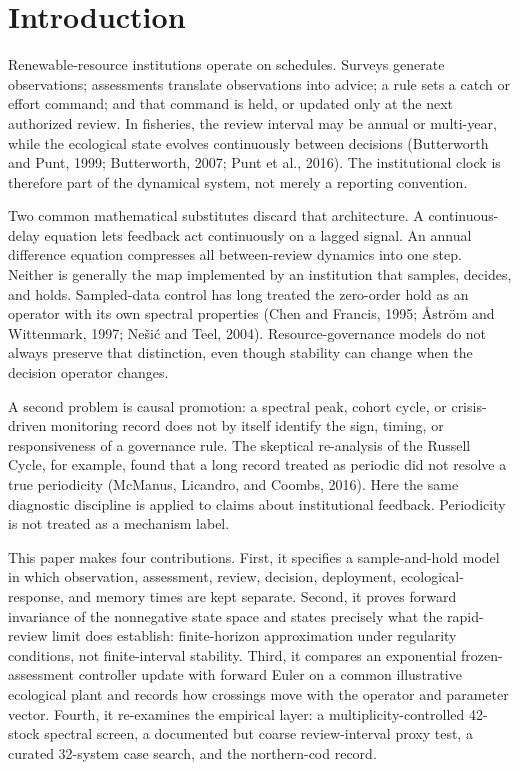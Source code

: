 \section{Introduction}\label{sec:introduction}

Renewable-resource institutions operate on schedules. Surveys generate observations; assessments translate observations into advice; a rule sets a catch or effort command; and that command is held, or updated only at the next authorized review. In fisheries, the review interval may be annual or multi-year, while the ecological state evolves continuously between decisions (Butterworth and Punt, 1999; Butterworth, 2007; Punt et al., 2016). The institutional clock is therefore part of the dynamical system, not merely a reporting convention.

Two common mathematical substitutes discard that architecture. A continuous-delay equation lets feedback act continuously on a lagged signal. An annual difference equation compresses all between-review dynamics into one step. Neither is generally the map implemented by an institution that samples, decides, and holds. Sampled-data control has long treated the zero-order hold as an operator with its own spectral properties (Chen and Francis, 1995; \AA{}str\"om and Wittenmark, 1997; Ne\v{s}i\'c and Teel, 2004). Resource-governance models do not always preserve that distinction, even though stability can change when the decision operator changes.

A second problem is causal promotion: a spectral peak, cohort cycle, or crisis-driven monitoring record does not by itself identify the sign, timing, or responsiveness of a governance rule. The skeptical re-analysis of the Russell Cycle, for example, found that a long record treated as periodic did not resolve a true periodicity (McManus, Licandro, and Coombs, 2016). Here the same diagnostic discipline is applied to claims about institutional feedback. Periodicity is not treated as a mechanism label.

This paper makes four contributions. First, it specifies a sample-and-hold model in which observation, assessment, review, decision, deployment, ecological-response, and memory times are kept separate. Second, it proves forward invariance of the nonnegative state space and states precisely what the rapid-review limit does establish: finite-horizon approximation under regularity conditions, not finite-interval stability. Third, it compares an exponential frozen-assessment controller update with forward Euler on a common illustrative ecological plant and records how crossings move with the operator and parameter vector. Fourth, it re-examines the empirical layer: a multiplicity-controlled 42-stock spectral screen, a documented but coarse review-interval proxy test, a curated 32-system case search, and the northern-cod record.

